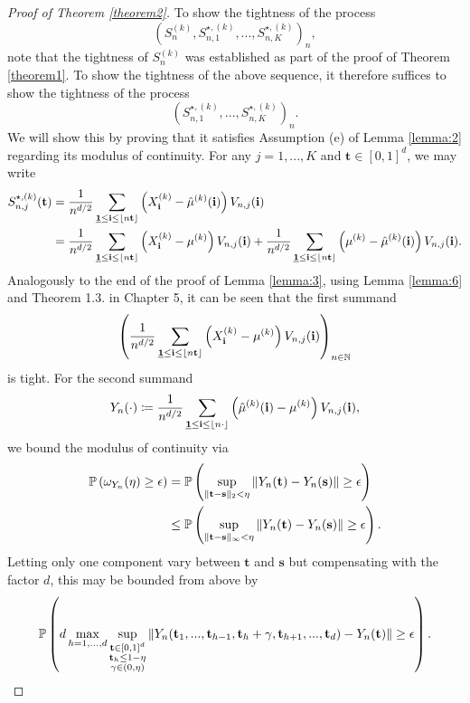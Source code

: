 \begin{proof}[Proof of Theorem \ref{theorem2}]
    To show the tightness of the process
    \[ (S_n^{(k)}, S_{n, 1}^{\star, (k)}, ..., S_{n, K}^{\star, (k)})_n, \]
    note that the tightness of $S_n^{(k)}$ was established as part of the proof of Theorem \ref{theorem1}. To show the tightness of the above sequence, it therefore suffices to show the tightness of the process
    \[ (S_{n, 1}^{\star, (k)}, ..., S_{n, K}^{\star, (k)})_n. \]
    We will show this by proving that it satisfies Assumption (e) of Lemma \ref{lemma:2} regarding its modulus of continuity.
    For any $j =1, ..., K$ and $\mathbf{t} \in [0,1]^d$, we may write
    \begin{align*}
        S_{n, j}^{\star, (k)}(\mathbf{t})
        & = \frac{1}{n^{d/2}} \sum\limits_{\usbf[1] \leq \mathbf{i} \leq \floor{n \mathbf{t}}} \left( X_{\mathbf{i}}^{(k)} - \hat{\mu}^{(k)}(\mathbf{i}) \right) V_{n, j}(\mathbf{i}) \\
        & = \frac{1}{n^{d/2}} \sum\limits_{\usbf[1] \leq \mathbf{i} \leq \floor{n \mathbf{t}}} \left( X_{\mathbf{i}}^{(k)} - \mu^{(k)} \right) V_{n, j}(\mathbf{i}) + \frac{1}{n^{d/2}} \sum\limits_{\usbf[1] \leq \mathbf{i} \leq \floor{n \mathbf{t}}} \left( \mu^{(k)} - \hat{\mu}^{(k)}(\mathbf{i}) \right) V_{n, j}(\mathbf{i}).
    \end{align*}
    Analogously to the end of the proof of Lemma \ref{lemma:3}, using Lemma \ref{lemma:6} and \cite{[11]bulinksi2007limittheorems} Theorem 1.3. in Chapter 5, it can be seen that the first summand
    \[ \left(\frac{1}{n^{d/2}} \sum\limits_{\usbf[1] \leq \mathbf{i} \leq \floor{n \mathbf{t}}} \left( X_{\mathbf{i}}^{(k)} - \mu^{(k)} \right) V_{n, j}(\mathbf{i})\right)_{n \in \NN} \]
    is tight. For the second summand
    \[ Y_n(\cdot) \coloneqq \frac{1}{n^{d/2}} \sum\limits_{\usbf[1] \leq \mathbf{i} \leq \floor{n \cdot}} \left( \hat{\mu}^{(k)}(\mathbf{i}) - \mu^{(k)} \right) V_{n, j}(\mathbf{i}), \]
    we bound the modulus of continuity via
    \begin{align*}
        \mathbb{P}\left(\omega_{Y_n}(\eta) \geq \epsilon\right)
        & = \mathbb{P}\left(\sup\limits_{\|\mathbf{t}-\mathbf{s} \|_2 < \eta} \| Y_n(\mathbf{t}) - Y_n(\mathbf{s}) \| \geq \epsilon\right) \\
        & \leq \mathbb{P}\left(\sup\limits_{\|\mathbf{t}-\mathbf{s} \|_\infty < \eta} \| Y_n(\mathbf{t}) - Y_n(\mathbf{s}) \| \geq \epsilon\right).
    \end{align*}
    Letting only one component vary between $\mathbf{t}$ and $\mathbf{s}$ but compensating with the factor $d$, this may be bounded from above by
    \[
        \mathbb{P}\left(d \max\limits_{h = 1, ..., d} \sup\limits_{\substack{\mathbf{t} \in [0,1]^d \\ \mathbf{t}_h \leq 1 - \eta \\ \gamma \in (0,\eta)}} \| Y_n(\mathbf{t}_1, ..., \mathbf{t}_{h-1}, \mathbf{t}_h + \gamma, \mathbf{t}_{h+1}, ..., \mathbf{t}_d) - Y_n(\mathbf{t}) \| \geq \epsilon\right).
\]
\end{proof}
